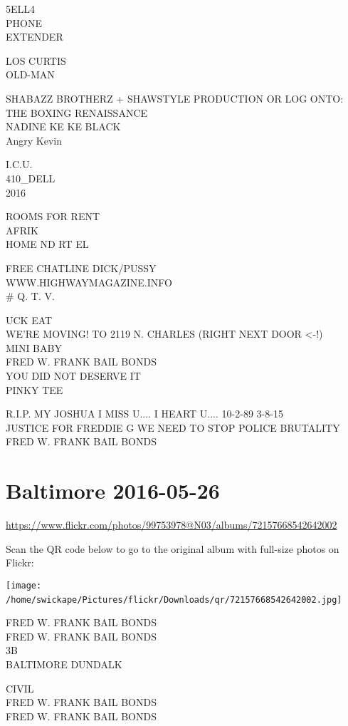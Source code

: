 \documentclass[10pt,letterpaper]{article}
\begin{document}
5ELL4\\
PHONE\\
EXTENDER

LOS CURTIS\\
OLD{-}MAN

SHABAZZ BROTHERZ + SHAWSTYLE PRODUCTION OR LOG ONTO: THE BOXING RENAISSANCE\\
NADINE KE KE BLACK\\
Angry Kevin

I.C.U.\\
410\_DELL\\
2016

ROOMS FOR RENT\\
AFRIK\\
HOME ND RT EL

FREE CHATLINE DICK/PUSSY\\
WWW.HIGHWAYMAGAZINE.INFO\\
\# Q. T. V.

UCK EAT\\
WE'RE MOVING!  TO 2119 N. CHARLES (RIGHT NEXT DOOR <{-}!)\\

MINI BABY\\
FRED W. FRANK BAIL BONDS\\
YOU DID NOT DESERVE IT\\
PINKY TEE

R.I.P. MY JOSHUA I MISS U.... I HEART U.... 10{-}2{-}89 3{-}8{-}15\\
JUSTICE FOR FREDDIE G WE NEED TO STOP POLICE BRUTALITY\\
FRED W. FRANK BAIL BONDS
\

\section*{Baltimore 2016-05-26}

\url{https://www.flickr.com/photos/99753978@N03/albums/72157668542642002}

Scan the QR code below to go to the original album with full-size photos on Flickr:

\texttt{[image: /home/swickape/Pictures/flickr/Downloads/qr/72157668542642002.jpg]}
\

FRED W. FRANK BAIL BONDS\\
FRED W. FRANK BAIL BONDS\\
3B\\
BALTIMORE DUNDALK

CIVIL\\
FRED W. FRANK BAIL BONDS\\
FRED W. FRANK BAIL BONDS
\end{document}

